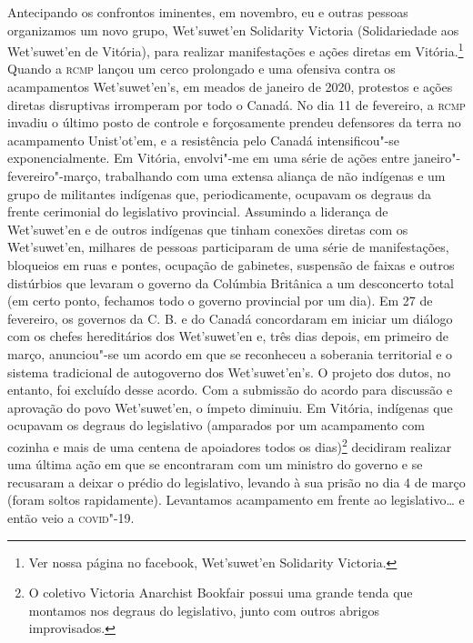 Antecipando os confrontos iminentes, em novembro, eu e outras pessoas
organizamos um novo grupo, Wet'suwet'en Solidarity Victoria
(Solidariedade aos Wet'suwet'en de Vitória), para realizar manifestações
e ações diretas em Vitória.\footnote{Ver nossa página no facebook,
  Wet'suwet'en Solidarity Victoria.} Quando a \textsc{rcmp} lançou um cerco
prolongado e uma ofensiva contra os acampamentos Wet'suwet'en's, em
meados de janeiro de 2020, protestos e ações diretas disruptivas
irromperam por todo o Canadá. No dia 11 de fevereiro, a \textsc{rcmp} invadiu o
último posto de controle e forçosamente prendeu defensores da terra no
acampamento Unist'ot'em, e a resistência pelo Canadá intensificou"-se
exponencialmente. Em Vitória, envolvi"-me em uma série de ações entre
janeiro"-fevereiro"-março, trabalhando com uma extensa aliança de não
indígenas e um grupo de militantes indígenas que, periodicamente,
ocupavam os degraus da frente cerimonial do legislativo provincial.
Assumindo a liderança de Wet'suwet'en e de outros indígenas que tinham
conexões diretas com os Wet'suwet'en, milhares de pessoas participaram
de uma série de manifestações, bloqueios em ruas e pontes, ocupação de
gabinetes, suspensão de faixas e outros distúrbios que levaram o governo
da Colúmbia Britânica a um desconcerto total (em certo ponto, fechamos
todo o governo provincial por um dia). Em 27 de fevereiro, os governos
da C. B. e do Canadá concordaram em iniciar um diálogo com os chefes
hereditários dos Wet'suwet'en e, três dias depois, em primeiro de março,
anunciou"-se um acordo em que se reconheceu a soberania territorial e o
sistema tradicional de autogoverno dos Wet'suwet'en's. O projeto dos
dutos, no entanto, foi excluído desse acordo. Com a submissão do acordo
para discussão e aprovação do povo Wet'suwet'en, o ímpeto diminuiu. Em
Vitória, indígenas que ocupavam os degraus do legislativo (amparados por
um acampamento com cozinha e mais de uma centena de apoiadores todos os
dias)\footnote{O coletivo Victoria Anarchist Bookfair possui uma grande
  tenda que montamos nos degraus do legislativo, junto com outros
  abrigos improvisados.} decidiram realizar uma última ação em que se
encontraram com um ministro do governo e se recusaram a deixar o prédio
do legislativo, levando à sua prisão no dia 4 de março (foram soltos
rapidamente). Levantamos acampamento em frente ao legislativo\ldots{} e então
veio a \textsc{covid}"-19.

